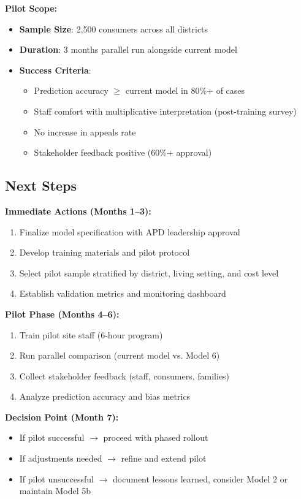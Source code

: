 \textbf{Pilot Scope:}
\begin{itemize}
    \item \textbf{Sample Size}: 2,500 consumers across all districts
    \item \textbf{Duration}: 3 months parallel run alongside current model
    \item \textbf{Success Criteria}: 
    \begin{itemize}
        \item Prediction accuracy $\geq$ current model in 80\%+ of cases
        \item Staff comfort with multiplicative interpretation (post-training survey)
        \item No increase in appeals rate
        \item Stakeholder feedback positive (60\%+ approval)
    \end{itemize}
\end{itemize}

\subsection{Next Steps}

\textbf{Immediate Actions (Months 1--3):}
\begin{enumerate}
    \item Finalize model specification with APD leadership approval
    \item Develop training materials and pilot protocol
    \item Select pilot sample stratified by district, living setting, and cost level
    \item Establish validation metrics and monitoring dashboard
\end{enumerate}

\textbf{Pilot Phase (Months 4--6):}
\begin{enumerate}
    \item Train pilot site staff (6-hour program)
    \item Run parallel comparison (current model vs. Model 6)
    \item Collect stakeholder feedback (staff, consumers, families)
    \item Analyze prediction accuracy and bias metrics
\end{enumerate}

\textbf{Decision Point (Month 7):}
\begin{itemize}
    \item If pilot successful $\rightarrow$ proceed with phased rollout
    \item If adjustments needed $\rightarrow$ refine and extend pilot
    \item If pilot unsuccessful $\rightarrow$ document lessons learned, consider Model 2 or maintain Model 5b
\end{itemize}

